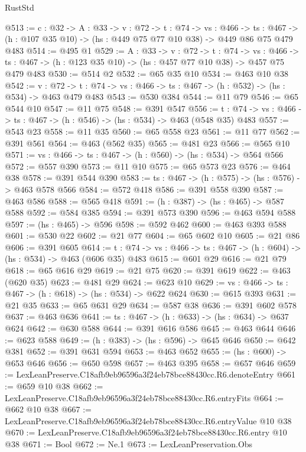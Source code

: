 \begin{lexlean}{RustStd}
\begin{coremodule}
@513 := {c : @32} ->
  {A : @33} ->
  {v : @72} ->
  {t : @74} ->
  {vs : @466} ->
  {ts : @467} -> (h : @107 @35 @10) -> (hs : @449 @75 @77 @10 @38) -> @449 @86 @75 @479 @483
@514 := @495 @1
@529 := {A : @33} ->
  {v : @72} ->
  {t : @74} ->
  {vs : @466} -> {ts : @467} -> (h : @123 @35 @10) -> (hs : @457 @77 @10 @38) -> @457 @75 @479 @483
@530 := @514 @2
@532 := @65 @35 @10
@534 := @463 @10 @38
@542 := {v : @72} ->
  {t : @74} -> {vs : @466} -> {ts : @467} -> (h : @532) -> (hs : @534) -> @463 @479 @483
@543 := @530 @384
@544 := @11 @79
@546 := @65 @544 @10
@547 := @11 @75
@548 := @391 @547
@556 := {t : @74} -> {vs : @466} -> {ts : @467} -> (h : @546) -> (hs : @534) -> @463 (@548 @35) @483
@557 := @543 @23
@558 := @11 @35
@560 := @65 @558 @23
@561 := @11 @77
@562 := @391 @561
@564 := @463 (@562 @35)
@565 := @481 @23
@566 := @565 @10
@571 := {vs : @466} -> {ts : @467} -> (h : @560) -> (hs : @534) -> @564 @566
@572 := @557 @390
@573 := @11 @10
@575 := @65 @573 @23
@576 := @464 @38
@578 := @391 @544 @390
@583 := {ts : @467} -> (h : @575) -> (hs : @576) -> @463 @578 @566
@584 := @572 @418
@586 := @391 @558 @390
@587 := @463 @586
@588 := @565 @418
@591 := (h : @387) -> (hs : @465) -> @587 @588
@592 := @584 @385
@594 := @391 @573 @390
@596 := @463 @594 @588
@597 := (hs : @465) -> @596
@598 := @592 @462
@600 := @463 @393 @588
@601 := @530 @22
@602 := @21 @77
@604 := @65 @602 @10
@605 := @21 @86
@606 := @391 @605
@614 := {t : @74} -> {vs : @466} -> {ts : @467} -> (h : @604) -> (hs : @534) -> @463 (@606 @35) @483
@615 := @601 @29
@616 := @21 @79
@618 := @65 @616 @29
@619 := @21 @75
@620 := @391 @619
@622 := @463 (@620 @35)
@623 := @481 @29
@624 := @623 @10
@629 := {vs : @466} -> {ts : @467} -> (h : @618) -> (hs : @534) -> @622 @624
@630 := @615 @393
@631 := @21 @35
@633 := @65 @631 @29
@634 := @587 @38
@636 := @391 @602 @578
@637 := @463 @636
@641 := {ts : @467} -> (h : @633) -> (hs : @634) -> @637 @624
@642 := @630 @588
@644 := @391 @616 @586
@645 := @463 @644
@646 := @623 @588
@649 := (h : @383) -> (hs : @596) -> @645 @646
@650 := @642 @381
@652 := @391 @631 @594
@653 := @463 @652
@655 := (hs : @600) -> @653 @646
@656 := @650 @598
@657 := @463 @395
@658 := @657 @646
@659 := LexLeanPreserve.C18afb9eb96596a3f24eb78bce88430cc.R6.denoteEntry
@661 := @659 @10 @38
@662 := LexLeanPreserve.C18afb9eb96596a3f24eb78bce88430cc.R6.entryFits
@664 := @662 @10 @38
@667 := LexLeanPreserve.C18afb9eb96596a3f24eb78bce88430cc.R6.entryValue @10 @38
@670 := LexLeanPreserve.C18afb9eb96596a3f24eb78bce88430cc.R6.entry @10 @38
@671 := Bool
@672 := Ne.{1}
@673 := LexLeanPreservation.Obs

\end{coremodule}
\end{lexlean}

